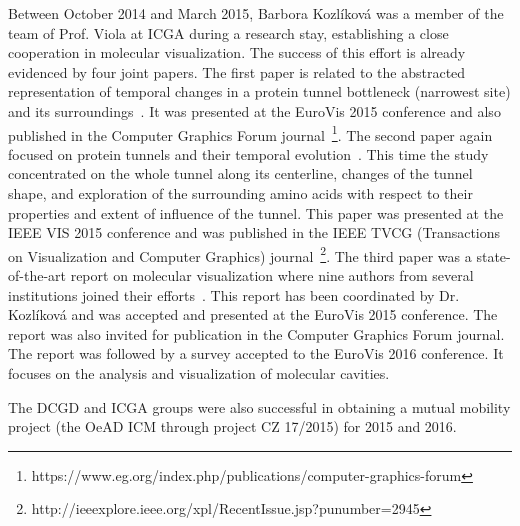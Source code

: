 \documentclass[11pt,a4paper,titlepage,oneside,onecolumn]{article}
\begin{document}
Between October 2014 and March 2015, Barbora Kozl\'{i}kov\'{a} was a member of the team of Prof. Viola at ICGA during a research stay, establishing a close cooperation in molecular visualization. 
The success of this effort is already evidenced by four joint papers. 
The first paper is related to the abstracted representation of temporal changes in a protein tunnel bottleneck (narrowest site) and its surroundings~\cite{molecollar}. 
It was presented at the EuroVis 2015 conference and also published in the Computer Graphics Forum journal~\footnote{https://www.eg.org/index.php/publications/computer-graphics-forum}. 
The second paper again focused on protein tunnels and their temporal evolution~\cite{animoamino}.
This time the study concentrated on the whole tunnel along its centerline, changes of the tunnel shape, and exploration of the surrounding amino acids with respect to their properties and extent of influence of the tunnel.
This paper was presented at the IEEE VIS 2015 conference and was published in the IEEE TVCG (Transactions on Visualization and Computer Graphics) journal~\footnote{http://ieeexplore.ieee.org/xpl/RecentIssue.jsp?punumber=2945}.
The third paper was a state-of-the-art report on molecular visualization where nine authors from several institutions joined their efforts~\cite{kozlikova_visualization_2015}. 
This report has been coordinated by Dr. Kozl\'{i}kov\'{a} and was accepted and presented at the EuroVis 2015 conference. The report was also invited for publication in the Computer Graphics Forum journal.
The report was followed by a survey accepted to the EuroVis 2016 conference. 
It focuses on the analysis and visualization of molecular cavities.

The DCGD and ICGA groups were also successful in obtaining a mutual mobility project (the OeAD ICM through project CZ 17/2015) for 2015 and 2016.


\end{document}
